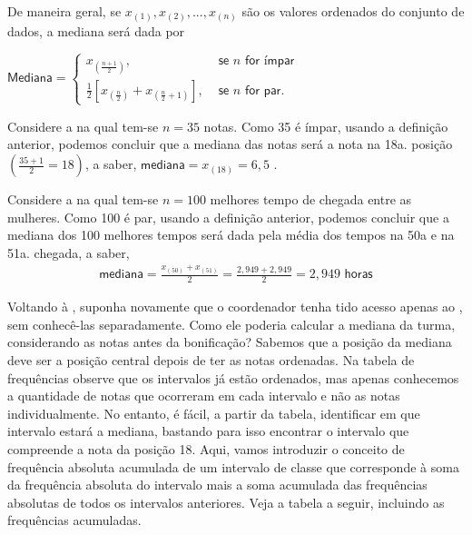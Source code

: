 De maneira geral, se \(x_{(1)},x_{(2)},...,x_{(n)}\) são os valores ordenados do conjunto de dados, a mediana será dada por

\(\textsf{Mediana}=\left \{ \begin{array}{lr}
x_{\left (\frac{n+1}{2}\right )}, &\textsf{ se }n \textsf{ for ímpar}\\
\frac{1}{2} [ x_{\left (\frac{n}{2}\right )}+x_{\left (\frac{n}{2}+1\right )} ], &\textsf{ se }n \textsf{ for par.}\end{array}\right.\)

Considere a  na qual tem-se \(n=35\) notas. Como 35 é ímpar, usando a definição anterior, podemos concluir que a mediana das notas será a nota na 18a. posição \(\left (\frac{35+1}{2}=18\right )\), a saber, \(\textsf{mediana}=x_{(18)}=6,5\) .

Considere a  na qual tem-se \(n=100\) melhores tempo de chegada entre as mulheres. Como 100 é par, usando a definição anterior, podemos concluir que a mediana dos 100 melhores tempos será dada pela média dos tempos na 50a e na 51a. chegada, a saber,
\begin{equation*}
\begin{split}\textsf{mediana}=\frac{x_{(50)}+x_{(51)}}{2}=\frac{2,949+2,949}{2}=2,949 \textsf{ horas}\end{split}
\end{equation*}

Voltando à , suponha novamente que o coordenador tenha tido acesso apenas ao
{\hyperref[\detokenize{PE104-0:fig-histograma-notas-sem-bonificacao}]{}}, sem conhecê-las separadamente.  Como ele poderia calcular a mediana da turma, considerando as notas antes da bonificação? Sabemos que a posição da mediana deve ser a posição central depois de ter as notas ordenadas. Na tabela de frequências observe que os intervalos já estão ordenados, mas apenas conhecemos a quantidade de notas que ocorreram em cada intervalo e não as notas individualmente. No entanto, é fácil, a partir da tabela, identificar em que intervalo estará a mediana, bastando para isso encontrar o intervalo que compreende a nota da posição 18. Aqui, vamos introduzir o conceito de frequência absoluta acumulada de um intervalo de classe que corresponde à soma da frequência absoluta do intervalo mais a soma acumulada das frequências absolutas  de todos os intervalos anteriores. Veja a tabela a seguir, incluindo as frequências acumuladas.


